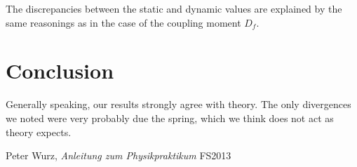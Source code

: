 \documentclass{scrreprt}
\begin{document}
The discrepancies between the static and dynamic values are explained by the same reasonings as in the case of the coupling moment $D_f$.


\section{Conclusion}
Generally speaking, our results strongly agree with theory. The only divergences we noted were very probably due the spring, which we think does not act as theory expects.

\begin{thebibliography}{9}

  Peter Wurz,
  \emph{Anleitung zum Physikpraktikum}
  FS2013

\end{thebibliography}
\end{document}
